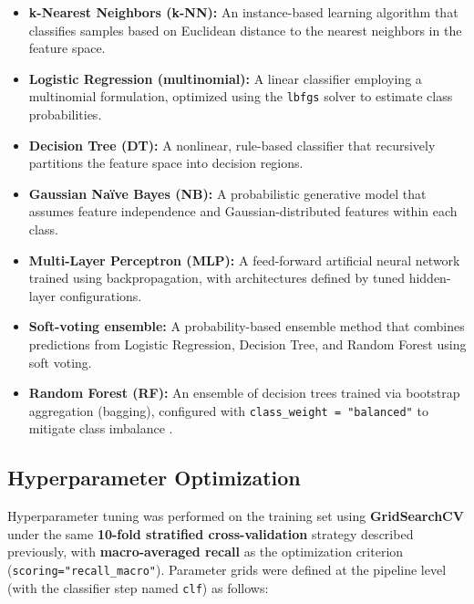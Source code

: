 \documentclass[sigconf]{acmart}
\begin{document}
\begin{itemize}
    \item \textbf{k-Nearest Neighbors (k-NN):} An instance-based learning algorithm that classifies samples based on Euclidean distance to the nearest neighbors in the feature space.
    \item \textbf{Logistic Regression (multinomial):} A linear classifier employing a multinomial formulation, optimized using the \texttt{lbfgs} solver to estimate class probabilities.
    \item \textbf{Decision Tree (DT):} A nonlinear, rule-based classifier that recursively partitions the feature space into decision regions.
    \item \textbf{Gaussian Naïve Bayes (NB):} A probabilistic generative model that assumes feature independence and Gaussian-distributed features within each class.
    \item \textbf{Multi-Layer Perceptron (MLP):} A feed-forward artificial neural network trained using backpropagation, with architectures defined by tuned hidden-layer configurations.
    \item \textbf{Soft-voting ensemble:} A probability-based ensemble method that combines predictions from Logistic Regression, Decision Tree, and Random Forest using soft voting.
    \item \textbf{Random Forest (RF):} An ensemble of decision trees trained via bootstrap aggregation (bagging), configured with \texttt{class\_weight = "balanced"} to mitigate class imbalance \cite{breiman2001}.
\end{itemize}


\subsection{Hyperparameter Optimization}
\label{subsec:hyperparams}

Hyperparameter tuning was performed on the training set using \textbf{GridSearchCV} under the same
\textbf{10-fold stratified cross-validation} strategy described previously, with
\textbf{macro-averaged recall} as the optimization criterion
(\texttt{scoring=\allowbreak"recall\_\allowbreak macro"}). Parameter grids were defined at the pipeline level
(with the classifier step named \texttt{clf}) as follows:
\end{document}
